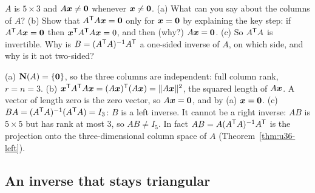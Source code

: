 \begin{exercise}[Question 4]\label{exr:u40-q4}
$A$ is $5\times3$ and $A\boldsymbol{x}\neq\boldsymbol{0}$ whenever $\boldsymbol{x}\neq\boldsymbol{0}$.
(a) What can you say about the columns of $A$?
(b) Show that $A^{\mathsf{T}} A\boldsymbol{x}=\boldsymbol{0}$ only for $\boldsymbol{x}=\boldsymbol{0}$ by explaining the key step: if $A^{\mathsf{T}} A\boldsymbol{x}=\boldsymbol{0}$ then $\boldsymbol{x}^{\mathsf{T}} A^{\mathsf{T}} A\boldsymbol{x}=0$, and then (why?) $A\boldsymbol{x}=\boldsymbol{0}$.
(c) So $A^{\mathsf{T}} A$ is invertible. Why is $B=(A^{\mathsf{T}} A)^{-1}A^{\mathsf{T}}$ a one-sided inverse of $A$, on which side, and why is it not two-sided?
\end{exercise}
\begin{solution}
(a) $\mathbf{N}(A)=\{\boldsymbol{0}\}$, so the three columns are independent: full column rank, $r=n=3$.
(b) $\boldsymbol{x}^{\mathsf{T}} A^{\mathsf{T}} A\boldsymbol{x}=(A\boldsymbol{x})^{\mathsf{T}}(A\boldsymbol{x})=\|A\boldsymbol{x}\|^{2}$, the squared length of $A\boldsymbol{x}$. A vector of length zero is the zero vector, so $A\boldsymbol{x}=\boldsymbol{0}$, and by (a) $\boldsymbol{x}=\boldsymbol{0}$.
(c) $BA=(A^{\mathsf{T}} A)^{-1}(A^{\mathsf{T}} A)=I_3$: $B$ is a left inverse. It cannot be a right inverse: $AB$ is $5\times5$ but has rank at most $3$, so $AB\neq I_5$. In fact $AB=A(A^{\mathsf{T}} A)^{-1}A^{\mathsf{T}}$ is the projection onto the three-dimensional column space of $A$ (Theorem~\ref{thm:u36-left}).
\end{solution}

\subsection{An inverse that stays triangular}

